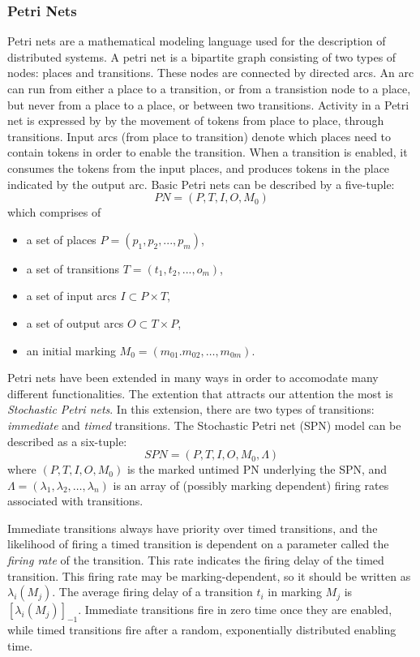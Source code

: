\documentclass[11pt]{book}
\begin{document}
\subsubsection{Petri Nets}
Petri nets are a mathematical modeling language used for the description of distributed systems. A petri net is a bipartite graph consisting of two types of nodes: places and transitions. These nodes are connected by directed arcs. An arc can run from either a place to a transition, or from a transistion node to a place, but never from a place to a place, or between two transitions. Activity in a Petri net is expressed by by the movement of tokens from place to place, through transitions. Input arcs (from place to transition) denote which places need to contain tokens in order to enable the transition. When a transition is enabled, it consumes the tokens from the input places, and produces tokens in the place indicated by the output arc.
Basic Petri nets can be described by a five-tuple:
\begin{equation}
PN = (P,T,I,O,M_0)
\end{equation}
which comprises of
\begin{itemize}
\item a set of places $P = (p_1, p_2, ..., p_m)$,
\item a set of transitions $T = (t_1, t_2, ...,o_m)$,
\item a set of input arcs $I \subset P \times T$,
\item a set of output arcs $O \subset T \times P$,
\item an initial marking $M_0 = (m_{01}. m_{02}, \ldots, m_{0m})$.

\end{itemize}

Petri nets have been extended in many ways in order to accomodate many different functionalities. The extention that attracts our attention the most is \emph{Stochastic Petri nets}. In this extension, there are two types of transitions: \emph{immediate} and \emph{timed} transitions.
The Stochastic Petri net (SPN) model can be described as a six-tuple:
\begin{equation}
SPN = (P,T,I,O,M_0,\Lambda)
\end{equation}
where $(P,T,I,O,M_0)$ is the marked untimed PN underlying the SPN, and $\Lambda = (\lambda_1, \lambda_2, \ldots, \lambda_n)$ is an array of (possibly marking dependent) firing rates associated with transitions.

Immediate transitions always have priority over timed transitions, and  the likelihood of firing a timed transition is dependent on a parameter called the \emph{firing rate} of the transition. This rate indicates the firing delay of the timed transition. This firing rate may be marking-dependent, so it should be written as $\lambda_i(M_j)$.  The average firing delay of a transition $t_i$ in marking $M_j$ is $[\lambda_i(M_j)]_{-1}$. Immediate transitions fire in zero time once they are enabled, while timed transitions fire after a random, exponentially distributed enabling time.
\end{document}

